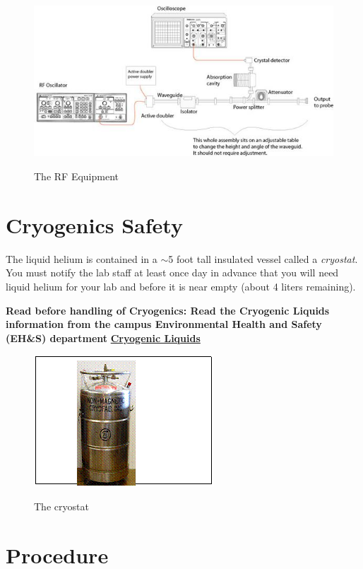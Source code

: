\documentclass{../lab}
\begin{document}
\begin{figure}[h]
    \centering
    \href{http://experimentationlab.berkeley.edu/sites/default/files/images/JOS9.jpg}{\includegraphics[width=0.7\linewidth]{images/JOS9.jpg}}
    \caption{The RF Equipment}
    \label{fig:RFEquipment}
\end{figure}

\section{Cryogenics Safety}

The liquid helium is contained in a $\sim$5 foot tall insulated vessel called a \emph{cryostat}. You must notify the lab staff at least once day in advance that you will need liquid helium for your lab and before it is near empty (about 4 liters remaining).

\textbf{Read before handling of Cryogenics: Read the Cryogenic Liquids information from the campus Environmental Health and Safety (EH\&S) department } \href{http://experimentationlab.berkeley.edu/sites/default/files/images/77cryogenic.pdf}{\textbf{Cryogenic Liquids}}

\begin{figure}[h]
    \centering
    \href{http://experimentationlab.berkeley.edu/sites/default/files/images/JOS10.gif}{\includegraphics[width=0.4\linewidth]{images/JOS10.png}}
    \caption{The cryostat}
    \label{fig:JOS10}
\end{figure}

\section{Procedure}
\end{document}

